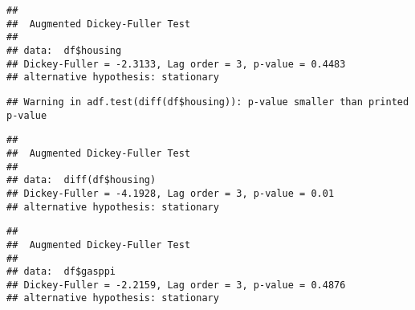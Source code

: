 \documentclass[
]{article}
\newenvironment{Shaded}{\begin{snugshade}}{\end{snugshade}}
\newcommand{\AttributeTok}[1]{\textcolor[rgb]{0.13,0.29,0.53}{#1}}
\newcommand{\CommentTok}[1]{\textcolor[rgb]{0.56,0.35,0.01}{\textit{#1}}}
\newcommand{\DecValTok}[1]{\textcolor[rgb]{0.00,0.00,0.81}{#1}}
\newcommand{\FunctionTok}[1]{\textcolor[rgb]{0.13,0.29,0.53}{\textbf{#1}}}
\newcommand{\NormalTok}[1]{#1}
\newcommand{\SpecialCharTok}[1]{\textcolor[rgb]{0.81,0.36,0.00}{\textbf{#1}}}
\begin{document}
\begin{verbatim}
## 
##  Augmented Dickey-Fuller Test
## 
## data:  df$housing
## Dickey-Fuller = -2.3133, Lag order = 3, p-value = 0.4483
## alternative hypothesis: stationary
\end{verbatim}

\begin{Shaded}
\end{Shaded}

\begin{verbatim}
## Warning in adf.test(diff(df$housing)): p-value smaller than printed p-value
\end{verbatim}

\begin{verbatim}
## 
##  Augmented Dickey-Fuller Test
## 
## data:  diff(df$housing)
## Dickey-Fuller = -4.1928, Lag order = 3, p-value = 0.01
## alternative hypothesis: stationary
\end{verbatim}

\begin{Shaded}
\end{Shaded}

\begin{verbatim}
## 
##  Augmented Dickey-Fuller Test
## 
## data:  df$gasppi
## Dickey-Fuller = -2.2159, Lag order = 3, p-value = 0.4876
## alternative hypothesis: stationary
\end{verbatim}

\begin{Shaded}
\end{Shaded}
\end{document}
